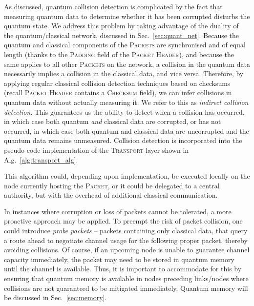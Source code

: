 \documentclass[aps,rmp,twocolumn,amsmath,amssymb,nofootinbib,superscriptaddress,longbibliography,floatfix,table-of-contents,eqsecnum]{revtex4-1}
\begin{document}
As discussed, quantum collision detection is complicated by the fact that measuring quantum data to determine whether it has been corrupted disturbs the quantum state. We address this problem by taking advantage of the duality of the quantum/classical network, discussed in Sec.~\ref{sec:quant_net}. Because the quantum and classical components of the \textsc{Packets} are synchronised and of equal length (thanks to the \textsc{Padding} field of the \textsc{Packet Header}), and because the same applies to all other \textsc{Packets} on the network, a collision in the quantum data necessarily implies a collision in the classical data, and vice versa. Therefore, by applying regular classical collision detection techniques based on checksums (recall \textsc{Packet Header} contains a \textsc{Checksum} field), we can infer collisions in quantum data without actually measuring it. We refer to this as \textit{indirect collision detection}. This guarantees us the ability to detect when a collision has occurred, in which case both quantum \textit{and} classical data are corrupted, or has not occurred, in which case both quantum and classical data are uncorrupted and the quantum data remains unmeasured. Collision detection is incorporated into the pseudo-code implementation of the \textsc{Transport} layer shown in Alg.~\ref{alg:transport_alg}.

This algorithm could, depending upon implementation, be executed locally on the node currently hosting the \textsc{Packet}, or it could be delegated to a central authority, but with the overhead of additional classical communication.

In instances where corruption or loss of packets cannot be tolerated, a more proactive approach may be applied. To preempt the risk of packet collision, one could introduce \textit{probe packets} -- packets containing only classical data, that query a route ahead to negotiate channel usage for the following proper packet, thereby avoiding collisions. Of course, if an upcoming node is unable to guarantee channel capacity immediately, the packet may need to be stored in quantum memory until the channel is available. Thus, it is important to accommodate for this by ensuring that quantum memory is available in nodes preceding links/nodes where collisions are not guaranteed to be mitigated immediately. Quantum memory will be discussed in Sec.~\ref{sec:memory}.

%
%
\end{document}
